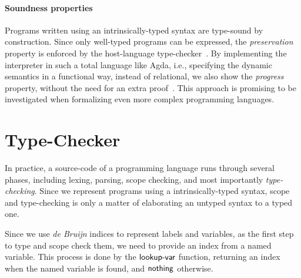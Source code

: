 \documentclass[review]{elsarticle}
\theoremstyle{definition}
\newcommand{\Con}[1]{\red{\mathsf{#1}}}
\newcommand{\F}[1]{\green{\mathsf{#1}}}
\begin{document}

\paragraph{Soundness properties}{Programs written using an intrinsically-typed syntax are type-sound by
construction. Since only well-typed programs can be expressed, the \emph{preservation} property is
enforced by the host-language type-checker~\cite{Amin17}. By implementing the interpreter in such a
total language like Agda, i.e., specifying the dynamic semantics in a functional way, instead of
relational, we also show the \emph{progress} property, without the need for an extra proof~\cite{Owens2016}.
This approach is promising to be investigated when formalizing even more complex programming languages.}

\section{Type-Checker}\label{sec:typechecker}

In practice, a source-code of a programming language runs through several phases, including lexing, parsing,
scope checking, and most importantly \emph{type-checking}. Since we represent programs using a
intrinsically-typed syntax, scope and type-checking is only a matter of elaborating an untyped syntax
to a typed one.


Since we use \emph{de Bruijn} indices to represent labels and variables, as the first step to type and scope
check them, we need to provide an index from a named variable. This process is done by the
\ensuremath{\F{lookup\textrm{-}var}} function, returning an index when the named variable is found, and \ensuremath{\Con{nothing}} otherwise.
\end{document}
